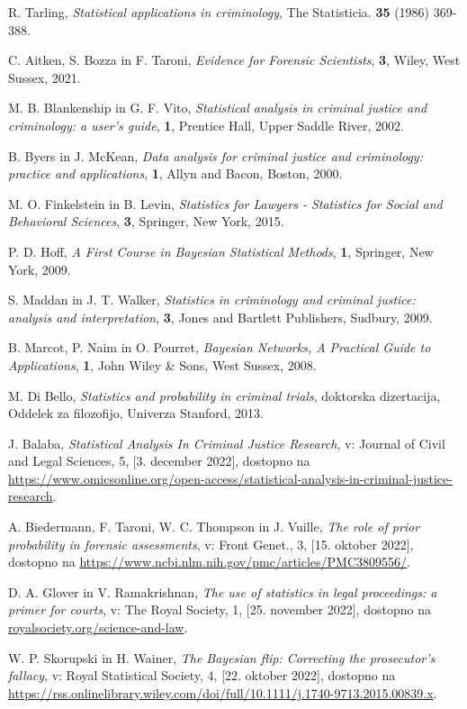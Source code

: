 \documentclass[fin1, tisk]{fmfdelo}
\theoremstyle{definition} %
\theoremstyle{trditev} %
\theoremstyle{izrek}
\begin{document}
\begin{thebibliography}{99}
        R. Tarling, \emph{Statistical applications in criminology}, The Statisticia. \textbf{35} (1986) 369-388.

        C. Aitken, S. Bozza in F. Taroni, \emph{Evidence for Forensic Scientists}, \textbf{3}, Wiley, West Sussex, 2021.

        M. B. Blankenship in G. F. Vito, \emph{Statistical analysis in criminal justice and criminology: a user's guide}, \textbf{1}, Prentice Hall, Upper Saddle River, 2002.

        B. Byers in J. McKean, \emph{Data analysis for criminal justice and criminology: practice and applications}, \textbf{1}, Allyn and Bacon, Boston, 2000.

        M. O. Finkelstein in B. Levin, \emph{Statistics for Lawyers - Statistics for Social and Behavioral Sciences}, \textbf{3}, Springer, New York, 2015.

        P. D. Hoff, \emph{A First Course in Bayesian Statistical Methods}, \textbf{1}, Springer, New York, 2009.

        S. Maddan in J. T. Walker, \emph{Statistics in criminology and criminal justice: analysis and interpretation}, \textbf{3}, Jones and Bartlett Publishers, Sudbury, 2009.

        B. Marcot, P. Naim in O. Pourret, \emph{Bayesian Networks, A Practical Guide to Applications}, \textbf{1}, John Wiley \& Sons, West Sussex, 2008.

        M. Di Bello, \emph{Statistics and probability in criminal trials}, doktorska dizertacija, Oddelek za filozofijo, Univerza Stanford, 2013.

        J. Balaba, \emph{Statistical Analysis In Criminal Justice Research}, v: Journal of Civil and Legal Sciences, 5, [3. december 2022], dostopno na \url{https://www.omicsonline.org/open-access/statistical-analysis-in-criminal-justice-research}.

        A. Biedermann, F. Taroni, W. C. Thompson in J. Vuille, \emph{The role of prior probability in forensic assessments}, v: Front Genet., 3, [15. oktober 2022], dostopno na \url{https://www.ncbi.nlm.nih.gov/pmc/articles/PMC3809556/}.

        D. A. Glover in V. Ramakrishnan, \emph{The use of statistics in legal proceedings: a primer for courts}, v: The Royal Society, 1, [25. november 2022], dostopno na \url{royalsociety.org/science-and-law}.

        W. P. Skorupski in H. Wainer, \emph{The Bayesian flip: Correcting the prosecutor's fallacy}, v: Royal Statistical Society, 4, [22. oktober 2022], dostopno na \url{https://rss.onlinelibrary.wiley.com/doi/full/10.1111/j.1740-9713.2015.00839.x}.
\end{thebibliography}
\end{document}
